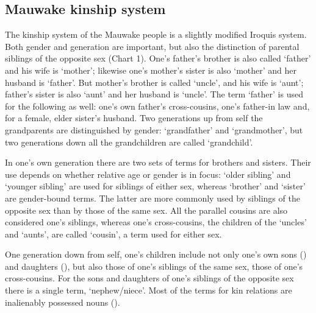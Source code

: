 \subsection{Mauwake kinship system} \label{sec:1.3.6}
The kinship system of the Mauwake people is a slightly modified Iroquis system. Both gender and generation are important, but also the distinction of parental siblings of the opposite sex (Chart 1). One's father's brother is also called  `father' and his wife is  `mother'; likewise one's mother's sister is also `mother' and her husband is `father'. But mother's brother is called  `uncle', and his wife is  `aunt'; father's sister is also `aunt' and her husband is `uncle'. The term `father' is used for the following as well: one's own father's cross-cousins, one's father-in law and, for a female, elder sister's husband. Two generations up from self the grandparents are distinguished by gender:  `grandfather' and  `grandmother', but two generations down all the grandchildren are called  `grandchild'. 

In one's own generation there are two sets of terms for brothers and sisters. Their use  depends on whether relative age or gender is in focus:  `older sibling' and  `younger sibling' are used for siblings of either sex, whereas  `brother'  and  `sister' are gender-bound terms. The latter are more commonly used by siblings of the opposite sex than by those of the same sex. All the parallel cousins are also considered one's siblings, whereas one's cross-cousins, the children of the `uncles' and `aunts', are called  `cousin', a term used for either sex.

One generation down from self, one's children include not only one's own sons () and daughters (), but also those of one's siblings of the same sex,  those of one's cross-cousins. For the sons and daughters of one's siblings of the opposite sex there is a single term,  `nephew/niece'. Most of the terms for kin relations are inalienably possessed nouns (). 

